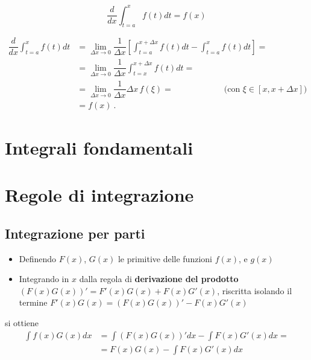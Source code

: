 \begin{theorem}
    \begin{equation}
        \dfrac{d}{dx} \int_{t=a}^{x} f(t) dt = f(x)
    \end{equation}
\end{theorem}
\begin{equation}
    \begin{aligned}
        \dfrac{d}{dx} \int_{t=a}^{x} f(t) dt & = 
        \lim_{\Delta x \rightarrow 0} \dfrac{1}{\Delta x} \left[ \int_{t=a}^{x+\Delta x} f(t) dt - \int_{t=a}^{x} f(t) dt\right] = \\
        & = \lim_{\Delta x \rightarrow 0} \dfrac{1}{\Delta x} \int_{t=x}^{x+\Delta x} f(t) dt = \\
        & = \lim_{\Delta x \rightarrow 0} \dfrac{1}{\Delta x} \Delta x \, f(\xi) = \qquad \qquad \qquad \text{(con $\xi \in [x, x+\Delta x]$)} \\
        & = f(x)  \  .
    \end{aligned}
\end{equation}

\section{Integrali fondamentali}

\section{Regole di integrazione}
\subsection{Integrazione per parti}
\begin{itemize}
 \item Definendo $F(x)$, $G(x)$ le primitive delle funzioni $f(x)$, e $g(x)$
 \item Integrando in $x$ dalla regola di \textbf{derivazione del prodotto} $(F(x)G(x))' = F'(x)G(x) + F(x)G'(x)$, riscritta isolando il termine $F'(x)G(x) = (F(x)G(x))' - F(x)G'(x)$
\end{itemize}
si ottiene
\begin{equation}
\begin{aligned}
    \int f(x) G(x) dx & = \int (F(x) G(x))' dx - \int F(x) G'(x) dx = \\
    &= F(x)G(x) - \int F(x) G'(x) dx 
\end{aligned}
\end{equation}

